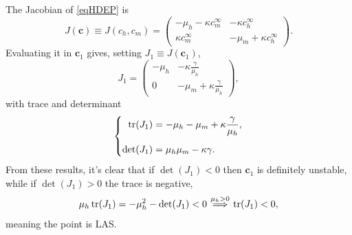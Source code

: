                 The Jacobian of \eqref{eqHDEP} is
                \begin{equation}
                    J(\mathbf c)\equiv J(c_h,c_m)=
                    \begin{pmatrix}
                        -\mu_h-\kappa c_m^\infty&-\kappa c_h^\infty\\
                        \kappa c_m^\infty&-\mu_m+\kappa c_h^\infty
                    \end{pmatrix}.
                    \label{eqHDEPJacobian}
                \end{equation}
                Evaluating it in $\mathbf c_1$ gives, setting $J_1\equiv J(\mathbf c_1)$,
                \begin{equation}
                    J_1=
                    \begin{pmatrix}
                        -\mu_h&-\kappa\frac\gamma{\mu_h}\\
                        0&-\mu_m+\kappa\frac\gamma{\mu_h}
                    \end{pmatrix},
                    \label{eqHDc1Jacobian}
                \end{equation}
                with trace and determinant
                \begin{equation}
                    \left\{
                    \begin{aligned}
                        \operatorname{tr}(J_1)&=-\mu_h-\mu_m+\kappa\frac\gamma{\mu_h},\\[5pt]
                        \det(J_1)&=\mu_h\mu_m-\kappa\gamma.
                    \end{aligned}
                    \right.
                    \label{eqHDc1TraceDet}
                \end{equation}
                From these results, it's clear that if $\det(J_1)<0$ then $\mathbf c_1$ is definitely unstable, while if $\det(J_1)>0$ the trace is negative,
                \begin{equation*}
                    \mu_h\trace(J_1)=-\mu^2_h-\det(J_1)<0
                    \overset{\mu_h>0}{\;\implies\;}\trace(J_1)<0,
                \end{equation*}
                meaning the point is LAS.

